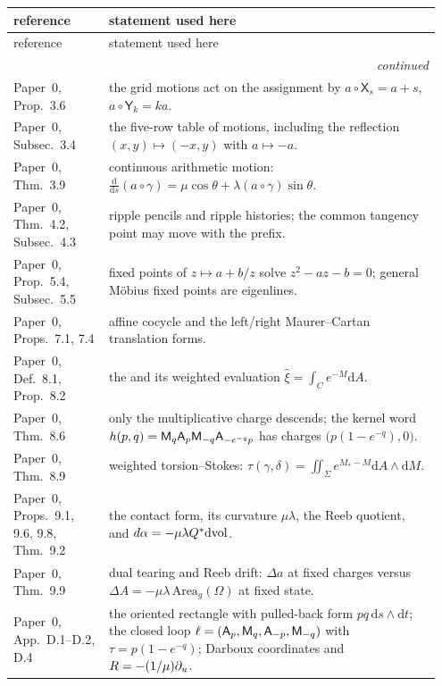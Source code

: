 {\small
\renewcommand{\arraystretch}{1.22}
\begin{longtable}{@{}p{0.215\linewidth}p{0.735\linewidth}@{}}
\toprule
reference & statement used here \\
\midrule
\endfirsthead
\toprule
reference & statement used here \\
\midrule
\endhead
\midrule
\multicolumn{2}{r}{\emph{continued}}\\
\endfoot
\bottomrule
\endlastfoot
Paper~0, Prop.~3.6 & the grid motions act on the assignment by
$a\circ\mathsf X_s=a+s$, $a\circ\mathsf Y_k=ka$. \\
Paper~0, Subsec.~3.4 & the five-row table of motions, including the reflection
$(x,y)\mapsto(-x,y)$ with $a\mapsto-a$. \\
Paper~0, Thm.~3.9 & continuous arithmetic motion:
$\frac{\mathrm d}{\mathrm ds}(a\circ\gamma)=\mu\cos\theta+\lambda(a\circ\gamma)\sin\theta$. \\
Paper~0, Thm.~4.2, Subsec.~4.3 & ripple pencils and ripple histories; the
common tangency point may move with the prefix. \\
Paper~0, Prop.~5.4, Subsec.~5.5 & fixed points of $z\mapsto a+b/z$ solve
$z^2-az-b=0$; general M\"obius fixed points are eigenlines. \\
Paper~0, Props.~7.1, 7.4 & affine cocycle and the left/right Maurer--Cartan
translation forms. \\
Paper~0, Def.~8.1, Prop.~8.2 & the \ACS{} and its weighted evaluation
$\hat\xi=\int_C e^{-M}\mathrm dA$. \\
Paper~0, Thm.~8.6 & only the multiplicative charge descends; the kernel word
$h(p,q)=\mathsf M_q\mathsf A_p\mathsf M_{-q}\mathsf A_{-e^{-q}p}$ has charges
$\bigl(p(1-e^{-q}),0\bigr)$. \\
Paper~0, Thm.~8.9 & weighted torsion--Stokes:
$\tau(\gamma,\delta)=\iint_{\Sigma}e^{M_*-M}\mathrm dA\wedge\mathrm dM$. \\
Paper~0, Props.~9.1, 9.6, 9.8, Thm.~9.2 & the contact form, its curvature
$\mu\lambda$, the Reeb quotient, and $d\alpha=-\mu\lambda Q^*\mathrm d\mathrm{vol}$. \\
Paper~0, Thm.~9.9 & dual tearing and Reeb drift: $\Delta a$ at fixed charges
versus $\Delta A=-\mu\lambda\,\mathrm{Area}_g(\Omega)$ at fixed state. \\
Paper~0, App.~D.1--D.2, D.4 & the oriented rectangle with pulled-back form
$pq\,\mathrm ds\wedge\mathrm dt$; the closed loop
$\ell=(\mathsf A_p,\mathsf M_q,\mathsf A_{-p},\mathsf M_{-q})$ with $\tau=p(1-e^{-q})$; Darboux
coordinates and $R=-(1/\mu)\partial_u$. \\

\end{longtable}}
